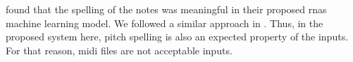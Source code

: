 

\textcite{micchi2020not} found that the spelling of the
notes was meaningful in their proposed \glspl{rna} machine
learning model. We followed a similar approach in
\textcite{napoleslopez2021augmentednet}. Thus, in the
proposed system here, pitch spelling is also an expected
property of the inputs. For that reason, \gls{midi} files
are not acceptable inputs.
